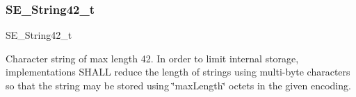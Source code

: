 \subsubsection{\texorpdfstring{S\+E\+\_\+\+String42\+\_\+t}{SE\_String42\_t}}
{\footnotesize\ttfamily S\+E\+\_\+\+String42\+\_\+t}

Character string of max length 42. In order to limit internal storage, implementations S\+H\+A\+LL reduce the length of strings using multi-\/byte characters so that the string may be stored using \char`\"{}max\+Length\char`\"{} octets in the given encoding. 